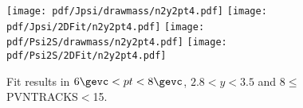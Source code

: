 \begin{figure}[H]
\begin{center}
\texttt{[image: pdf/Jpsi/drawmass/n2y2pt4.pdf]}
\texttt{[image: pdf/Jpsi/2DFit/n2y2pt4.pdf]}
\vspace*{-0.5cm}
\texttt{[image: pdf/Psi2S/drawmass/n2y2pt4.pdf]}
\texttt{[image: pdf/Psi2S/2DFit/n2y2pt4.pdf]}
\vspace*{-0.5cm}
\end{center}
\caption{Fit results in $6\gevc<pt<8\gevc$, $2.8<y<3.5$ and 8$\leq$PVNTRACKS$<$15.}
\label{Fitn2y2pt4}
\end{figure}
